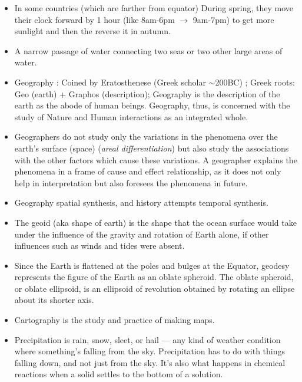 \documentclass[8pt, a4paper, oneside, twocolumn]{extarticle}
\begin{document}
\begin{itemize}
  \item In some countries (which are farther from equator) During spring, they move their clock forward by 1 hour (like 8am-6pm $\rightarrow$ 9am-7pm) to get more sunlight and then the reverse it in autumn.
  \item A narrow passage of water connecting two seas or two other large areas of water.
  \item Geography : Coined by Eratosthenese (Greek scholar $\sim$200BC) ; Greek roots: Geo (earth) + Graphos (description); Geography is the description of the earth as the abode of human beings. Geography, thus, is concerned with the study of Nature and Human interactions as an integrated whole. 
  \item Geographers do not study only the variations in the phenomena over the earth’s surface (space) (\textit{areal differentiation}) but also study the associations with the other factors which cause these variations. A geographer explains the phenomena in a frame of cause and effect relationship, as it does not only help in interpretation but also foresees the phenomena in future.
  \item Geography spatial synthesis, and history attempts temporal synthesis. 
  \item The geoid (aka shape of earth) is the shape that the ocean surface would take under the influence of the gravity and rotation of Earth alone, if other influences such as winds and tides were absent.
  \item Since the Earth is flattened at the poles and bulges at the Equator, geodesy represents the figure of the Earth as an oblate spheroid. The oblate spheroid, or oblate ellipsoid, is an ellipsoid of revolution obtained by rotating an ellipse about its shorter axis.
  \item Cartography is the study and practice of making maps.
  \item Precipitation is rain, snow, sleet, or hail — any kind of weather condition where something's falling from the sky. Precipitation has to do with things falling down, and not just from the sky. It's also what happens in chemical reactions when a solid settles to the bottom of a solution.
\end{itemize}
\end{document}

